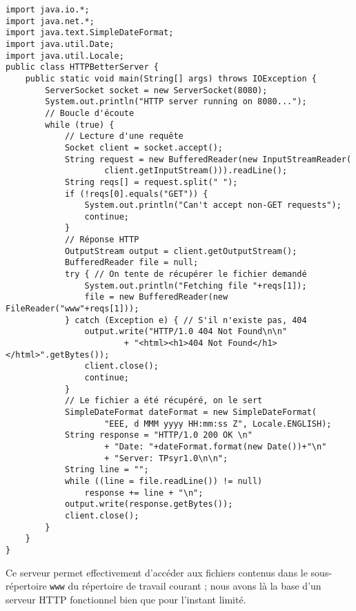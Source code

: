 \documentclass[a4paper]{article}
\begin{document}
\begin{lstlisting}
import java.io.*;
import java.net.*;
import java.text.SimpleDateFormat;
import java.util.Date;
import java.util.Locale;
public class HTTPBetterServer {
    public static void main(String[] args) throws IOException {
        ServerSocket socket = new ServerSocket(8080);
        System.out.println("HTTP server running on 8080...");
        // Boucle d'écoute
        while (true) {
            // Lecture d'une requête
            Socket client = socket.accept();
            String request = new BufferedReader(new InputStreamReader(
            		client.getInputStream())).readLine();
            String reqs[] = request.split(" ");
            if (!reqs[0].equals("GET")) {
                System.out.println("Can't accept non-GET requests");
                continue;
            }
            // Réponse HTTP
            OutputStream output = client.getOutputStream();
            BufferedReader file = null;
            try { // On tente de récupérer le fichier demandé
                System.out.println("Fetching file "+reqs[1]);
                file = new BufferedReader(new FileReader("www"+reqs[1]));
            } catch (Exception e) { // S'il n'existe pas, 404
                output.write("HTTP/1.0 404 Not Found\n\n"
                		+ "<html><h1>404 Not Found</h1></html>".getBytes());
                client.close();
                continue;
            }
            // Le fichier a été récupéré, on le sert
            SimpleDateFormat dateFormat = new SimpleDateFormat(
            		"EEE, d MMM yyyy HH:mm:ss Z", Locale.ENGLISH);
            String response = "HTTP/1.0 200 OK \n"
                    + "Date: "+dateFormat.format(new Date())+"\n"
                    + "Server: TPsyr1.0\n\n";
            String line = "";
            while ((line = file.readLine()) != null)
                response += line + "\n";
            output.write(response.getBytes());
            client.close();
        }
    }
}
\end{lstlisting}

Ce serveur permet effectivement d'accéder aux fichiers contenus dans le sous-répertoire \verb?www? du répertoire de travail courant ; nous avons là la base d'un serveur HTTP fonctionnel bien que pour l'instant limité.
\end{document}
